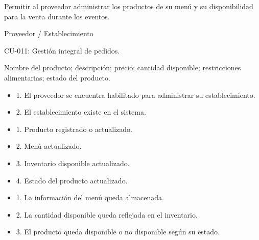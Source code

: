 \begin{description}[leftmargin=!, labelwidth=3.4cm, style=nextline, topsep=3pt]
\item[Objetivo] Permitir al proveedor administrar los productos de su menú y su disponibilidad para la venta durante los eventos.

\item[Actores] Proveedor / Establecimiento

\item[CU relacionados] CU-011: Gestión integral de pedidos.

\item[Entradas] Nombre del producto; descripción; precio; cantidad disponible; restricciones alimentarias; estado del producto.

\item[Pre-condiciones] \hfill
\begin{itemize}[leftmargin=1.2em, topsep=1pt]
  \item 1. El proveedor se encuentra habilitado para administrar su establecimiento.
  \item 2. El establecimiento existe en el sistema.
\end{itemize}

\item[Salidas] \hfill
\begin{itemize}[leftmargin=1.2em, topsep=1pt]
  \item 1. Producto registrado o actualizado.
  \item 2. Menú actualizado.
  \item 3. Inventario disponible actualizado.
  \item 4. Estado del producto actualizado.
\end{itemize}

\item[Post-condiciones] \hfill
\begin{itemize}[leftmargin=1.2em, topsep=1pt]
  \item 1. La información del menú queda almacenada.
  \item 2. La cantidad disponible queda reflejada en el inventario.
  \item 3. El producto queda disponible o no disponible según su estado.
\end{itemize}

\end{description}

